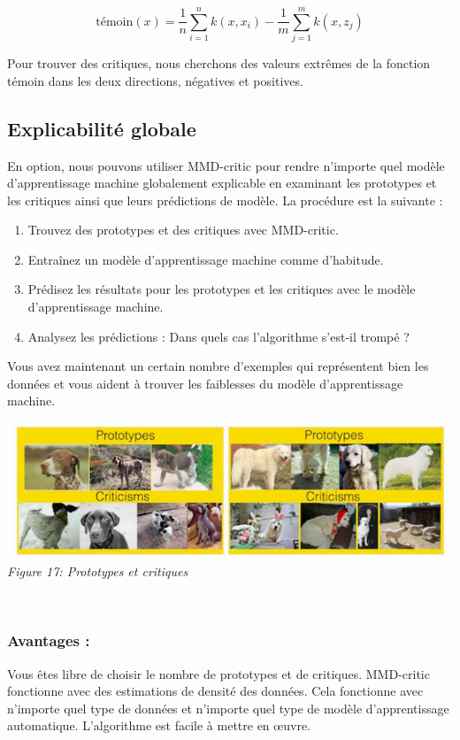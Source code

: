 \[
\text{témoin}(x) = \frac{1}{n} \sum_{i=1}^n k(x, x_i) - \frac{1}{m} \sum_{j=1}^m k(x, z_j)
\]

Pour trouver des critiques, nous cherchons des valeurs extrêmes de la fonction témoin dans les deux directions, négatives et positives.

\subsection{Explicabilité globale}
En option, nous pouvons utiliser MMD-critic pour rendre n'importe quel modèle d'apprentissage machine globalement explicable en examinant les prototypes et les critiques ainsi que leurs prédictions de modèle. La procédure est la suivante :

\begin{enumerate}
    \item Trouvez des prototypes et des critiques avec MMD-critic.
    \item Entraînez un modèle d'apprentissage machine comme d'habitude.
    \item Prédisez les résultats pour les prototypes et les critiques avec le modèle d'apprentissage machine.
    \item Analysez les prédictions : Dans quels cas l'algorithme s'est-il trompé ?
\end{enumerate}
Vous avez maintenant un certain nombre d'exemples qui représentent bien les données et vous aident à trouver les faiblesses du modèle d'apprentissage machine.


\begin{center}
    \centering
    \includegraphics[width=0.7\linewidth]{Images/prototypes_critiques.png}
    \\
    \emph{Figure 17: Prototypes et critiques }
    \\
\end{center}
\\

\subsubsection{Avantages :}
Vous êtes libre de choisir le nombre de prototypes et de critiques. MMD-critic fonctionne avec des estimations de densité des données. Cela fonctionne avec n'importe quel type de données et n'importe quel type de modèle d'apprentissage automatique. L'algorithme est facile à mettre en œuvre.


